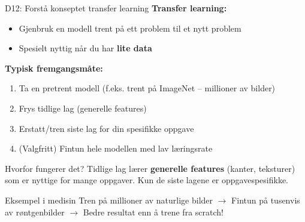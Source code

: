\documentclass[aspectratio=169, 10pt]{beamer}
\begin{document}
\begin{frame}{D12: Forstå konseptet transfer learning}
    \textbf{Transfer learning:}
    \begin{itemize}
        \item Gjenbruk en modell trent på ett problem til et nytt problem
        \item Spesielt nyttig når du har \textbf{lite data}
    \end{itemize}
    
    \vspace{0.3cm}
    \textbf{Typisk fremgangsmåte:}
    \begin{enumerate}
        \item Ta en pretrent modell (f.eks. trent på ImageNet -- millioner av bilder)
        \item Frys tidlige lag (generelle features)
        \item Erstatt/tren siste lag for din spesifikke oppgave
        \item (Valgfritt) Fintun hele modellen med lav læringsrate
    \end{enumerate}
    
    \vspace{0.3cm}
    \begin{alertblock}{\footnotesize Hvorfor fungerer det?}
        \footnotesize Tidlige lag lærer \textbf{generelle features} (kanter, teksturer) som er nyttige for mange oppgaver. Kun de siste lagene er oppgavespesifikke.
    \end{alertblock}

    \begin{block}{\footnotesize Eksempel i medisin}
        \footnotesize Tren på millioner av naturlige bilder $\rightarrow$ Fintun på tusenvis av røntgenbilder $\rightarrow$ Bedre resultat enn å trene fra scratch!
    \end{block}
\end{frame}
\end{document}
